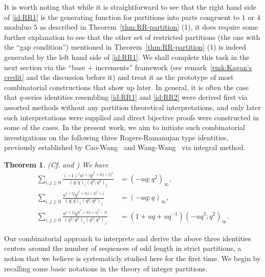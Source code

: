 \documentclass[11pt,reqno]{amsart}
\numberwithin{equation}{section}
\theoremstyle{plain}
\newtheorem{theorem}{Theorem}[section]
\theoremstyle{definition}
\begin{document}
It is worth noting that while it is straightforward to see that the right hand side of \eqref{id:RR1} is the generating function for partitions into parts congruent to $1$ or $4$ moduluo $5$ as described in Theorem~\ref{thm:RR-partition} (1), it does require some further explanation to see that the other set of restricted partitions (the one with the ``gap condition'') mentioned in Theorem~\ref{thm:RR-partition} (1) is indeed generated by the left hand side of \eqref{id:RR1}. We shall complete this task in the next section via the ``base $+$ increments'' framework (see remark~\ref{rmk:Kagan's credit} and the discussion before it) and treat it as the prototype of most combinatorial constructions that show up later. In general, it is often the case that $q$-series identities resembling \eqref{id:RR1} and \eqref{id:RR2} were derived first via assorted methods without any partition theoretical interpretations, and only later such interpretations were supplied and direct bijective proofs were constructed in some of the cases. In the present work, we aim to initiate such combinatorial investigations on the following three Rogers-Ramanujan type identities, previously established by Cao-Wang~\cite{CW23} and Wang-Wang~\cite{WW23} via integral method.
\begin{theorem}\label{thm:three (1,2)}
(Cf. \cite[Th.~3.8]{CW23} and \cite[Th.~3.1]{WW23}) We have
\begin{align}
\sum\limits_{i, j\geq 0}\frac{(-1)^{j}u^{i+j}q^{i^2+2ij+2j^2}}{(q;q)_{i}(q^2;q^2)_{j}} &=(-uq; q^2)_{\infty},\label{id:(1,2)-1}\\
\sum_{i, j\geq 0}\frac{u^{i+2j}q^{i^2+2ij+2j^2+j}}{(q; q)_{i}(q^2; q^2)_{j}} &=(-uq; q)_{\infty},\label{id:(1,2)-2}\\
\sum_{i, j\geq 0}\frac{u^{i+2j}q^{2i^2+4ij+4j^2-3i}}{(q^2; q^2)_{i}(q^4; q^4)_{j}} &=(1+uq+uq^{-1})(-uq^3; q^2)_{\infty}.\label{id:(1,2)-3}
\end{align}
\end{theorem}

Our combinatorial approach to interprete and derive the above three identities centers around the number of sequences of odd length in strict partitions, a notion that we believe is systematicly studied here for the first time. We begin by recalling some basic notations in the theory of integer partitions.
\end{document}
